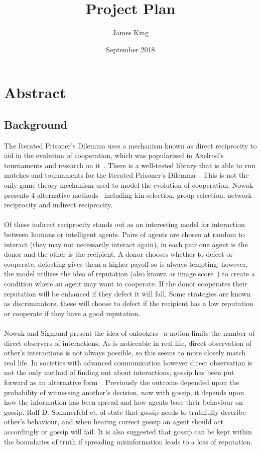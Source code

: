 \documentclass{article}
\title{Project Plan}
\author{James King}
\date{September 2018}
\begin{document}
\maketitle

\section*{Abstract}

\subsection*{Background}
The Iterated Prisoner's Dilemma uses a mechanism known as direct reciprocity to aid in the evolution of cooperation, which was popularized in Axelrod's tournaments and research on it~\cite{evolution_of_cooperation}. There is a well-tested library that is able to run matches and tournaments for the Iterated Prisoner's Dilemma~\cite{axelrodproject}. This is not the only game-theory mechanism used to model the evolution of cooperation. Nowak presents 4 alternative methods~\cite{five_rules_coop} including kin selection, group selection, network reciprocity and indirect reciprocity.\\\\
Of these indirect reciprocity stands out as an interesting model for interaction between humans or intelligent agents. Pairs of agents are chosen at random to interact (they may not necessarily interact again), in each pair one agent is the donor and the other is the recipient. A donor chooses whether to defect or cooperate, defecting gives them a higher payoff so is always tempting, however, the model utilizes the idea of reputation (also known as image score~\cite{evol_indirect_image}) to create a condition where an agent may want to cooperate. If the donor cooperates their reputation will be enhanced if they defect it will fall. Some strategies are known as discriminators, these will choose to defect if the recipient has a low reputation or cooperate if they have a good reputation.\\\\
Nowak and Sigmund present the idea of onlookers~\cite{evol_indirect_image} a notion limits the number of direct observers of interactions. As is noticeable in real life, direct observation of other's interactions is not always possible, so this seems to more closely match real life. In societies with advanced communication however direct observation is not the only method of finding out about interactions, gossip has been put forward as an alternative form~\cite{gossip_alt}. Previously the outcome depended upon the probability of witnessing another's decision, now with gossip, it depends upon how the information has been spread and how agents base their behaviour on gossip. Ralf D. Sommerfeld et. al state that gossip needs to truthfully describe other's behaviour, and when hearing correct gossip an agent should act accordingly or gossip will fail. It is also suggested that gossip can be kept within the boundaries of truth if spreading misinformation leads to a loss of reputation.\\\\
\end{document}
